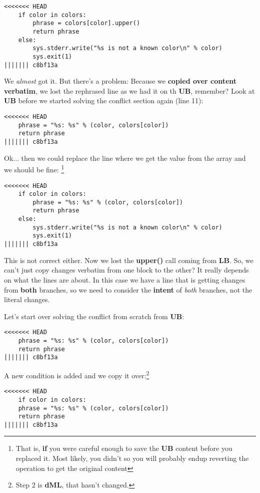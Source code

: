 \begin{lstlisting}[style=python_style, firstnumber=10, caption={\bf example 4} - Step 3 - Copy from LB]
<<<<<<< HEAD
    if color in colors:
        phrase = colors[color].upper()
        return phrase
    else:
        sys.stderr.write("%s is not a known color\n" % color)
        sys.exit(1)
||||||| c8bf13a
\end{lstlisting}
We {\it almost} got it. But there's a problem: Because we {\bf copied over content verbatim}, we lost the rephrased line as we had
it on th {\bf UB}, remember? Look at {\bf UB} before we started solving the conflict section again (line 11):

\begin{lstlisting}[style=python_style, firstnumber=10, caption={\bf example 4} - Step 1 - UB]
<<<<<<< HEAD
    phrase = "%s: %s" % (color, colors[color])
    return phrase
||||||| c8bf13a
\end{lstlisting}

Ok... then we could replace the line where we get the value from the array and we should be fine:
\footnote{That is, {\bf if} you were careful enough to save the {\bf UB} content before you replaced it. Most likely, you didn't so
you will probably endup reverting the operation to get the original content}
\begin{lstlisting}[style=python_style, firstnumber=10, caption={\bf example 4} - Step 4 - Edit UB]
<<<<<<< HEAD
    if color in colors:
        phrase = "%s: %s" % (color, colors[color])
        return phrase
    else:
        sys.stderr.write("%s is not a known color\n" % color)
        sys.exit(1)
||||||| c8bf13a
\end{lstlisting}

This is not correct either. Now we lost the {\bf upper()} call coming from {\bf LB}. So, we can't just copy changes verbatim
from one block to the other? It really depends on what the lines are about. In this case we have a line that is getting changes from
{\bf both} branches, so we need to consider the {\bf intent} of {\it both} branches, not the literal changes.

Let's start over solving the conflict from scratch from {\bf UB}:
\begin{lstlisting}[style=python_style, firstnumber=10, caption={\bf example 4} - Step 1 - UB]
<<<<<<< HEAD
    phrase = "%s: %s" % (color, colors[color])
    return phrase
||||||| c8bf13a
\end{lstlisting}

A new condition is added and we copy it over:\footnote{Step 2 is {\bf dML}, that hasn't changed.}
\begin{lstlisting}[style=python_style, firstnumber=10, caption={\bf example 4} - Step 3 - Conditional]
<<<<<<< HEAD
    if color in colors:
    phrase = "%s: %s" % (color, colors[color])
    return phrase
||||||| c8bf13a
\end{lstlisting}

